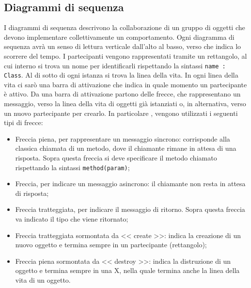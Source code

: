 \subsection{Diagrammi di sequenza}
\label{DiagrammiSequenza}
I diagrammi di sequenza descrivono la collaborazione di un gruppo di oggetti che devono implementare collettivamente un comportamento. Ogni diagramma di sequenza avrà un senso di lettura verticale dall'alto al basso, verso che indica lo scorrere del tempo. I partecipanti vengono rappresentati tramite un rettangolo, al cui interno si trova un nome per identificarli rispettando la sintassi \texttt{name : Class}. Al di sotto di ogni istanza si trova la linea della vita. In ogni linea della vita ci sarò una barra di attivazione che indica in quale momento un partecipante è attivo. Da una barra di attivazione partono delle frecce, che rappresentano un messaggio, verso la linea della vita di oggetti già istanziati o, in alternativa, verso un nuovo partecipante per crearlo. 
In particolare , vengono utilizzati i seguenti tipi di frecce:
\begin{itemize}
	\item Freccia piena, per rappresentare un messaggio sincrono: corrisponde alla classica chiamata di un metodo, dove il chiamante rimane in attesa di una risposta. Sopra questa freccia si deve specificare il metodo chiamato rispettando la sintassi \texttt{method(param)};
	\item  Freccia, per indicare un messaggio asincrono: il chiamante non resta in attesa di risposta;
	\item Freccia tratteggiata, per indicare il messaggio di ritorno. Sopra questa freccia va indicato il tipo che viene ritornato;
	\item Freccia tratteggiata sormontata da << create >>: indica la creazione di un nuovo oggetto e termina sempre in un partecipante (rettangolo);
	\item Freccia piena sormontata da << destroy >>: indica la distruzione di un oggetto e termina sempre in una X, nella quale termina anche la linea della vita di un oggetto.
\end{itemize}

